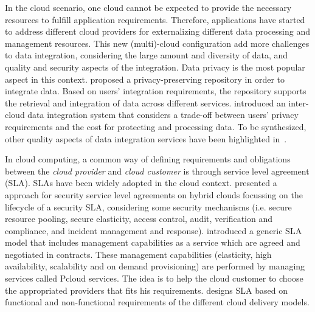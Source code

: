 \documentclass[12pt,a4paper,oneside]{report}
\begin{document}
In the cloud scenario, one cloud cannot be expected to provide the necessary resources to fulfill application requirements. 
Therefore, applications have started to address different cloud providers for externalizing different data processing and management resources.
This new (multi)-cloud configuration add more challenges to data integration, considering the large amount and diversity of data, and quality and security aspects of the integration.
Data privacy is the most popular aspect in this context.
\cite{YauY08} proposed a privacy-preserving repository in order to integrate data. 
Based on users' integration requirements, the repository supports the retrieval and integration of data across different services. 
\cite{096} introduced an inter-cloud data integration system that considers a trade-off between users' privacy requirements and the cost for protecting and processing data.
To be synthesized, other quality aspects of data integration services have been highlighted in~\cite{Dustdar:2012}.

\bigskip
In cloud computing, a common way of defining requirements and obligations between the \textit{cloud provider} and \textit{cloud customer} is through service level agreement (SLA). 
SLAs have been widely adopted in the cloud context. 
\cite{011} presented a approach for security service level agreements on hybrid clouds focussing on the lifecycle of a security SLA, considering some security mechanisms (i.e. secure resource pooling, secure elasticity, access control, audit, verification and compliance, and incident management and response).
\cite{009} introduced a generic SLA model that includes management capabilities as a service which are agreed and negotiated in contracts. 
These management capabilities (elasticity, high availability, scalability and on demand provisioning) are performed by managing services called Pcloud services. 
The idea is to help the cloud customer to choose the appropriated providers that fits his requirements. 
\cite{005} designs SLA based on functional and non-functional requirements of the different cloud delivery models.
\end{document}
